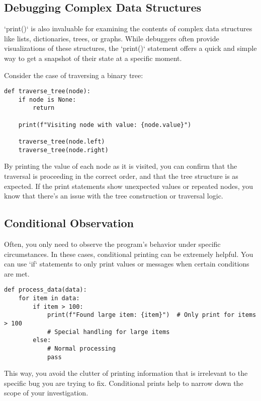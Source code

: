 \documentclass{article}
\begin{document}
\subsection*{Debugging Complex Data Structures}

`print()` is also invaluable for examining the contents of complex data structures like lists, dictionaries, trees, or graphs. While debuggers often provide visualizations of these structures, the `print()` statement offers a quick and simple way to get a snapshot of their state at a specific moment.

Consider the case of traversing a binary tree:

\begin{verbatim}
def traverse_tree(node):
    if node is None:
        return

    print(f"Visiting node with value: {node.value}")

    traverse_tree(node.left)
    traverse_tree(node.right)
\end{verbatim}

By printing the value of each node as it is visited, you can confirm that the traversal is proceeding in the correct order, and that the tree structure is as expected. If the print statements show unexpected values or repeated nodes, you know that there's an issue with the tree construction or traversal logic.

\subsection*{Conditional Observation}

Often, you only need to observe the program's behavior under specific circumstances. In these cases, conditional printing can be extremely helpful. You can use `if` statements to only print values or messages when certain conditions are met.

\begin{verbatim}
def process_data(data):
    for item in data:
        if item > 100:
            print(f"Found large item: {item}")  # Only print for items > 100
            # Special handling for large items
        else:
            # Normal processing
            pass
\end{verbatim}

This way, you avoid the clutter of printing information that is irrelevant to the specific bug you are trying to fix.  Conditional prints help to narrow down the scope of your investigation.
\end{document}
